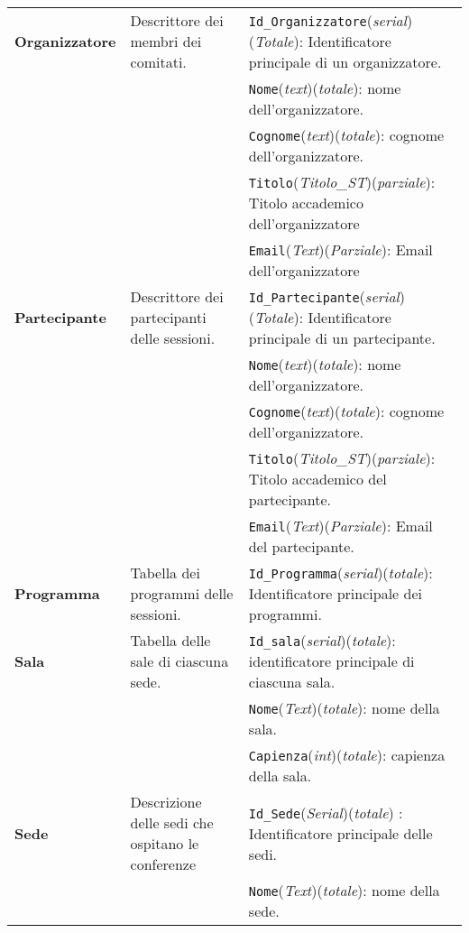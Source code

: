 \begin{longtable}{|p{}|p{}|p{}|}
	\textbf{Organizzatore} & Descrittore dei membri dei comitati. & \texttt{Id\_Organizzatore}(\textit{serial})(\textit{Totale}): Identificatore principale di un organizzatore. \\
	& & \texttt{Nome}(\textit{text})(\textit{totale}): nome dell'organizzatore. \\
	& & \texttt{Cognome}(\textit{text})(\textit{totale}): cognome dell'organizzatore. \\
	& & \texttt{Titolo}(\textit{Titolo\_ST})(\textit{parziale}): Titolo accademico dell'organizzatore \\
	& & \texttt{Email}(\textit{Text})(\textit{Parziale}): Email dell'organizzatore \\	\hline
	
	\textbf{Partecipante} & Descrittore dei partecipanti delle sessioni. & \texttt{Id\_Partecipante}(\textit{serial})(\textit{Totale}): Identificatore principale di un partecipante. \\
	& & \texttt{Nome}(\textit{text})(\textit{totale}): nome dell'organizzatore. \\
	& & \texttt{Cognome}(\textit{text})(\textit{totale}): cognome dell'organizzatore. \\
	& & \texttt{Titolo}(\textit{Titolo\_ST})(\textit{parziale}): Titolo accademico del partecipante. \\
	& & \texttt{Email}(\textit{Text})(\textit{Parziale}): Email del partecipante. \\	\hline
	
	\textbf{Programma} & Tabella dei programmi delle sessioni. & \texttt{Id\_Programma}(\textit{serial})(\textit{totale}): Identificatore principale dei programmi. \\ \hline
	
	\textbf{Sala} & Tabella delle sale di ciascuna sede. & \texttt{Id\_sala}(\textit{serial})(\textit{totale}): identificatore principale di ciascuna sala. \\
	& & \texttt{Nome}(\textit{Text})(\textit{totale}): nome della sala. \\
	& & \texttt{Capienza}(\textit{int})(\textit{totale}): capienza della sala.\\	\hline
	
	\textbf{Sede} & Descrizione delle sedi che ospitano le conferenze & \texttt{Id\_Sede}(\textit{Serial})(\textit{totale}) : Identificatore principale delle sedi. \\
	& & \texttt{Nome}(\textit{Text})(\textit{totale}): nome della sede. \\	\hline
	

\end{longtable}
